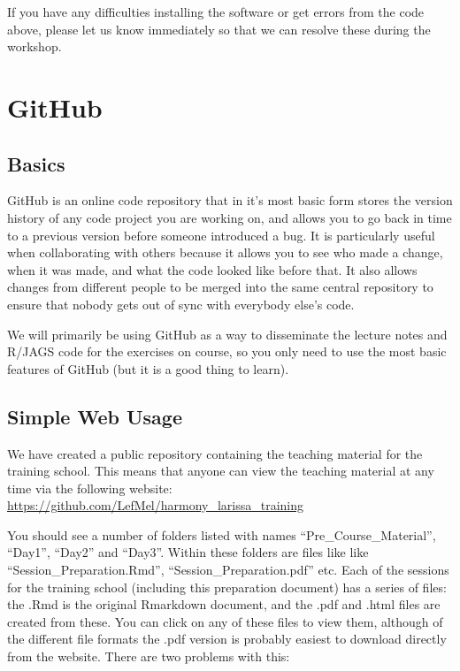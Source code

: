 \documentclass[
  12pt,
]{article}
\begin{document}
If you have any difficulties installing the software or get errors from
the code above, please let us know immediately so that we can resolve
these during the workshop.

\hypertarget{github}{%
\section{GitHub}\label{github}}

\hypertarget{basics}{%
\subsection{Basics}\label{basics}}

GitHub is an online code repository that in it's most basic form stores
the version history of any code project you are working on, and allows
you to go back in time to a previous version before someone introduced a
bug. It is particularly useful when collaborating with others because it
allows you to see who made a change, when it was made, and what the code
looked like before that. It also allows changes from different people to
be merged into the same central repository to ensure that nobody gets
out of sync with everybody else's code.

We will primarily be using GitHub as a way to disseminate the lecture
notes and R/JAGS code for the exercises on course, so you only need to
use the most basic features of GitHub (but it is a good thing to learn).

\hypertarget{simple-web-usage}{%
\subsection{Simple Web Usage}\label{simple-web-usage}}

We have created a public repository containing the teaching material for
the training school. This means that anyone can view the teaching
material at any time via the following website:
\url{https://github.com/LefMel/harmony_larissa_training}

You should see a number of folders listed with names
``Pre\_Course\_Material'', ``Day1'', ``Day2'' and ``Day3''. Within these
folders are files like like ``Session\_Preparation.Rmd'',
``Session\_Preparation.pdf'' etc. Each of the sessions for the training
school (including this preparation document) has a series of files: the
.Rmd is the original Rmarkdown document, and the .pdf and .html files
are created from these. You can click on any of these files to view
them, although of the different file formats the .pdf version is
probably easiest to download directly from the website. There are two
problems with this:
\end{document}
